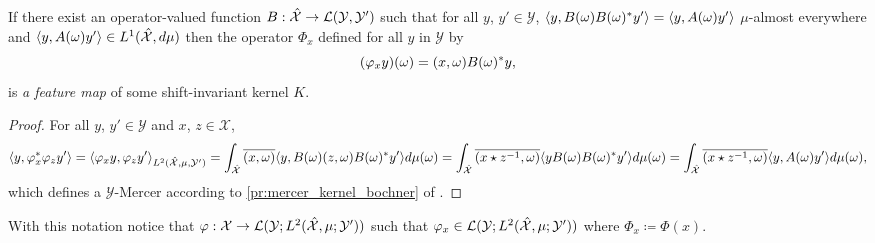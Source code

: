 \begin{proposition}\label{pr:fourier_feature_map}
If there exist an operator-valued function $B:\hat{\mathcal{X}}\to\mathcal{L}(\mathcal{Y},\mathcal{Y}')$ such that for all $y$, $y'\in\mathcal{Y}$, $\langle y, B(\omega)B(\omega)^*y'\rangle=\langle y, A(\omega)y'\rangle$ $\mu$-almost everywhere and $\langle y, A(\omega)y'\rangle\in L^1(\hat{\mathcal{X}},d\mu)$ then the operator $\Phi_x$ defined for all $y$ in $\mathcal{Y}$ by
\begin{dmath}
\label{eq:feature_shiftinv_map}
(\Phi_x y)(\omega)=\pairing{x,\omega}B(\omega)^*y,
\end{dmath}
is \emph{a feature map} of some shift-invariant kernel $K$.
\end{proposition}
\begin{proof}
For all $y$, $y'\in \mathcal{Y}$ and $x$, $z\in\mathcal{X}$,
\begin{dmath*}
\inner{y, \Phi_x^*\Phi_z y'} = \inner{\Phi_x y, \Phi_z y'}_{L^2(\dual{\mathcal{X}},\mu,\mathcal{Y}')} \\
= \int_{\dual{\mathcal{X}}}\conj{\pairing{x,\omega}}\inner{y, B(\omega)\pairing{z,\omega}B(\omega)^\adjoint y'}d\mu(\omega) \\
= \int_{\dual{\mathcal{X}}}\conj{\pairing{x \groupop \myinv{z},\omega}}\inner{y B(\omega)B(\omega)^\adjoint y'}d\mu(\omega) \\
= \int_{\dual{\mathcal{X}}}\conj{\pairing{x \groupop \inv{z},\omega}}\inner{y,A(\omega)y'}d\mu(\omega),
\end{dmath*}
which defines a $\mathcal{Y}$-Mercer according to \cref{pr:mercer_kernel_bochner} of \citet{Carmeli2010}.
\end{proof}
With this notation notice that $\Phi: \mathcal{X} \to \mathcal{L}(\mathcal{Y}; L^2(\dual{\mathcal{X}}, \mu; \mathcal{Y}'))$ such that $\Phi_x\in \mathcal{L}(\mathcal{Y}; L^2(\dual{\mathcal{X}}, \mu; \mathcal{Y}'))$ where $\Phi_x\coloneqq\Phi(x)$.

